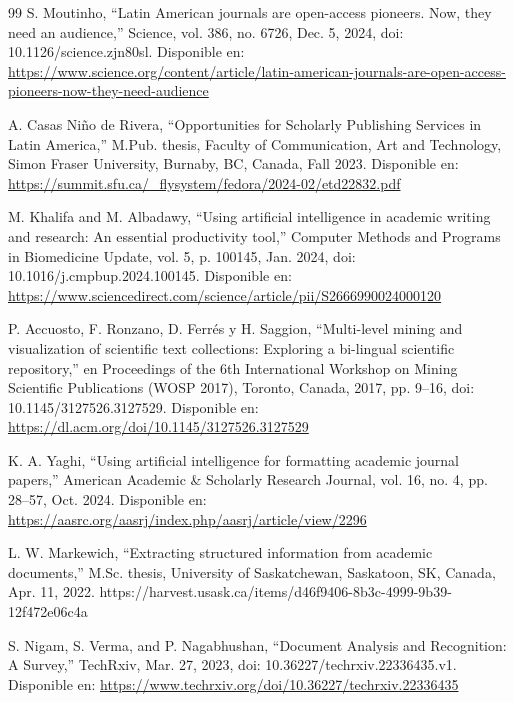 
\begin{thebibliography}{99}
\setlength{\itemsep}{4pt}
   S. Moutinho, “Latin American journals are open-access pioneers. Now, they need an audience,” Science, vol. 386, no. 6726, Dec. 5, 2024, doi: 10.1126/science.zjn80sl. Disponible en: \url{https://www.science.org/content/article/latin-american-journals-are-open-access-pioneers-now-they-need-audience}

   A. Casas Niño de Rivera, ``Opportunities for Scholarly Publishing Services in Latin America,'' M.Pub. thesis, Faculty of Communication, Art and Technology, Simon Fraser University, Burnaby, BC, Canada, Fall 2023. Disponible en: \url{https://summit.sfu.ca/_flysystem/fedora/2024-02/etd22832.pdf}

   M. Khalifa and M. Albadawy, “Using artificial intelligence in academic writing and research: An essential productivity tool,” Computer Methods and Programs in Biomedicine Update, vol. 5, p. 100145, Jan. 2024, doi: 10.1016/j.cmpbup.2024.100145. Disponible en: \url{https://www.sciencedirect.com/science/article/pii/S2666990024000120}

   P. Accuosto, F. Ronzano, D. Ferrés y H. Saggion, “Multi-level mining and visualization of scientific text collections: Exploring a bi-lingual scientific repository,” en Proceedings of the 6th International Workshop on Mining Scientific Publications (WOSP 2017), Toronto, Canada, 2017, pp. 9--16, doi: 10.1145/3127526.3127529. Disponible en: \url{https://dl.acm.org/doi/10.1145/3127526.3127529}

   K. A. Yaghi, “Using artificial intelligence for formatting academic journal papers,” American Academic \& Scholarly Research Journal, vol. 16, no. 4, pp. 28--57, Oct. 2024. Disponible en: \url{https://aasrc.org/aasrj/index.php/aasrj/article/view/2296}

   L. W. Markewich, “Extracting structured information from academic documents,” M.Sc. thesis, University of Saskatchewan, Saskatoon, SK, Canada, Apr. 11, 2022. https://harvest.usask.ca/items/d46f9406-8b3c-4999-9b39-12f472e06c4a

   S. Nigam, S. Verma, and P. Nagabhushan, “Document Analysis and Recognition: A Survey,” TechRxiv, Mar. 27, 2023, doi: 10.36227/techrxiv.22336435.v1. Disponible en: \url{https://www.techrxiv.org/doi/10.36227/techrxiv.22336435}


\end{thebibliography}
